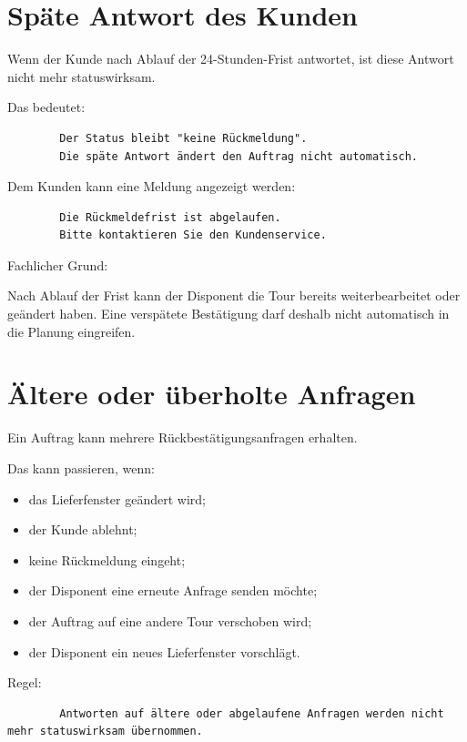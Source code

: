 \documentclass[12pt,a4paper]{article}
\begin{document}
	\section{Späte Antwort des Kunden}
	
	Wenn der Kunde nach Ablauf der 24-Stunden-Frist antwortet, ist diese Antwort nicht mehr statuswirksam.
	
	Das bedeutet:
	
	\begin{lstlisting}
		Der Status bleibt "keine Rückmeldung".
		Die späte Antwort ändert den Auftrag nicht automatisch.
	\end{lstlisting}
	
	Dem Kunden kann eine Meldung angezeigt werden:
	
	\begin{lstlisting}
		Die Rückmeldefrist ist abgelaufen.
		Bitte kontaktieren Sie den Kundenservice.
	\end{lstlisting}
	
	Fachlicher Grund:
	
	Nach Ablauf der Frist kann der Disponent die Tour bereits weiterbearbeitet oder geändert haben. Eine verspätete Bestätigung darf deshalb nicht automatisch in die Planung eingreifen.
	
	\section{Ältere oder überholte Anfragen}
	
	Ein Auftrag kann mehrere Rückbestätigungsanfragen erhalten.
	
	Das kann passieren, wenn:
	
	\begin{itemize}
		\item das Lieferfenster geändert wird;
		\item der Kunde ablehnt;
		\item keine Rückmeldung eingeht;
		\item der Disponent eine erneute Anfrage senden möchte;
		\item der Auftrag auf eine andere Tour verschoben wird;
		\item der Disponent ein neues Lieferfenster vorschlägt.
	\end{itemize}
	
	Regel:
	
	\begin{lstlisting}
		Antworten auf ältere oder abgelaufene Anfragen werden nicht mehr statuswirksam übernommen.
	\end{lstlisting}
	
\end{document}
